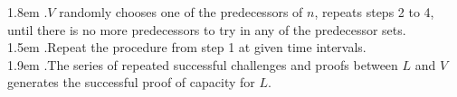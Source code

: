 \documentclass[10pt,a4paper]{article}
\begin{document}
\hangindent 1.8em
.\quad $V$ randomly chooses one of the predecessors of $n$, repeats steps 2 to 4, until there is no more predecessors to try in any of the predecessor sets.
\vspace{-0.8em}
\\

\hangindent 1.5em
.\quad Repeat the procedure from step 1 at given time intervals.
\vspace{-0.8em}
\\

\hangindent 1.9em
.\quad The series of repeated successful challenges and proofs between $L$ and $V$ generates the successful proof of capacity for $L$.
 \vspace{-0.5em}
\end{document}
